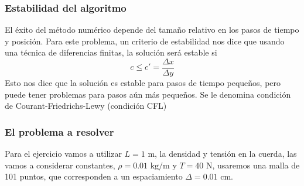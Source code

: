 \begin{frame}
\frametitle{Estabilidad del algoritmo}
El éxito del método numérico depende del tamaño relativo en los pasos de tiempo y posición. Para este problema, un criterio de estabilidad nos dice que usando una técnica de diferencias finitas, la solución será estable si
\[ c \leq c' = \dfrac{\Delta x }{\Delta y}\]
Esto nos dice que la solución es estable para pasos de tiempo pequeños, pero puede tener problemas para pasos aún más pequeños. Se le denomina condición de Courant-Friedrichs-Lewy (condición CFL)
\end{frame}
\begin{frame}
\frametitle{El problema a resolver}
Para el ejercicio vamos a utilizar $L=1$ m, la densidad y tensión en la cuerda, las vamos a considerar constantes, $\rho=0.01 \mbox{ kg/m}$ y $T=40$ N, usaremos una malla de 101 puntos, que corresponden a un espaciamiento $\Delta = 0.01$ cm.
\end{frame}
